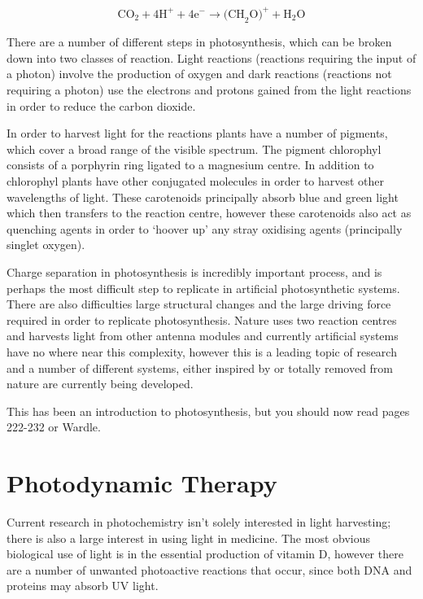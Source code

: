 \documentclass[
]{book}
\begin{document}
\begin{equation}
\textrm{CO}_2+ 4\textrm{H}^+ + 4\textrm{e}^- \longrightarrow \textrm{(CH}_2 \textrm{O)}^+ + \textrm{H}_2\textrm{O}
\label{eq:photosynhalf2}
\end{equation}

There are a number of different steps in photosynthesis, which can be broken down into two classes of reaction. Light reactions (reactions requiring the input of a photon) involve the production of oxygen and dark reactions (reactions not requiring a photon) use the electrons and protons gained from the light reactions in order to reduce the carbon dioxide.

In order to harvest light for the reactions plants have a number of pigments, which cover a broad range of the visible spectrum. The pigment chlorophyl consists of a porphyrin ring ligated to a magnesium centre. In addition to chlorophyl plants have other conjugated molecules in order to harvest other wavelengths of light. These carotenoids principally absorb blue and green light which then transfers to the reaction centre, however these carotenoids also act as quenching agents in order to `hoover up' any stray oxidising agents (principally singlet oxygen).

Charge separation in photosynthesis is incredibly important process, and is perhaps the most difficult step to replicate in artificial photosynthetic systems. There are also difficulties large structural changes and the large driving force required in order to replicate photosynthesis. Nature uses two reaction centres and harvests light from other antenna modules and currently artificial systems have no where near this complexity, however this is a leading topic of research and a number of different systems, either inspired by or totally removed from nature are currently being developed.

This has been an introduction to photosynthesis, but you should now read pages 222-232 or Wardle.

\hypertarget{sec:PDT}{%
\section{Photodynamic Therapy}\label{sec:PDT}}

Current research in photochemistry isn't solely interested in light harvesting; there is also a large interest in using light in medicine. The most obvious biological use of light is in the essential production of vitamin D, however there are a number of unwanted photoactive reactions that occur, since both DNA and proteins may absorb UV light.
\end{document}
